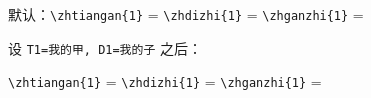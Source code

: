 \documentclass{article}
\begin{document}
\noindent 默认：\verb+\zhtiangan{1}+ = \quad
\verb+\zhdizhi{1}+ = \quad
\verb+\zhganzhi{1}+ = 

\medskip
{}
\noindent 设 \verb+T1=我的甲, D1=我的子+ 之后：

\noindent\verb+\zhtiangan{1}+ = \quad
\verb+\zhdizhi{1}+ = \quad
\verb+\zhganzhi{1}+ = 
\end{document}
